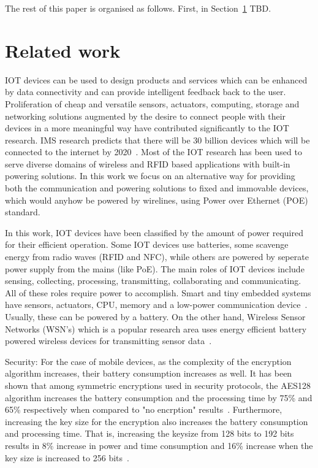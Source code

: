 \documentclass[draft,a4paper]{siamltex}
\begin{document}
The rest of this paper is organised as follows.  First, in
Section~\ref{sec:related} TBD.
 

\section{Related work}
\label{sec:related}

IOT devices can be used to design products and services which can be enhanced by
data connectivity and can provide intelligent feedback back to the user.
Proliferation of cheap and versatile sensors, actuators, computing, storage and
networking solutions augmented by the desire to connect people with their
devices in a more meaningful way have contributed significantly to the IOT
research. IMS research predicts that there will be 30 billion devices which will
be connected to the internet by 2020~\cite{ABIresearch}. Most of the IOT
research has been used to serve diverse domains of wireless and RFID based
applications with built-in powering solutions. In this work we focus on an
alternative way for providing both the communication and powering solutions to
fixed and immovable devices, which would anyhow be powered by wirelines, using
Power over Ethernet (POE) standard.

In this work, IOT devices have been classified by the amount of power required
for their efficient operation. Some IOT devices use batteries, some scavenge
energy from radio waves (RFID and NFC), while others are powered by seperate
power supply from the mains (like PoE).  The main roles of IOT devices include
sensing, collecting, processing, transmitting, collaborating and communicating.
All of these roles require power to accomplish. Smart and tiny embedded systems
have sensors, actuators, CPU, memory and a low-power communication
device~\cite{lopez2012adding}. Usually, these can be powered by a battery. On
the other hand, Wireless Sensor Networks (WSN's) which is a popular research
area uses energy efficient battery powered wireless devices for transmitting
sensor data~\cite{akyildiz2002wireless}.


Security:
For the case of mobile devices, as the complexity of the encryption algorithm
increases, their battery consumption increases as well. It has been shown that
among symmetric encryptions used in security protocols, the AES128 algorithm
increases the battery consumption and the processing time by 75\% and 65\%
respectively when compared to "no encrption" results~\cite{hamad2009energy}.
Furthermore, increasing the key size for the encryption also increases the
battery consumption and processing time. That is, increasing the keysize from
128 bits to 192 bits results in 8\% increase in power and time consumption and
16\% increase when the key size is increased to 256 bits~\cite{hamad2009energy}. 
\end{document}
